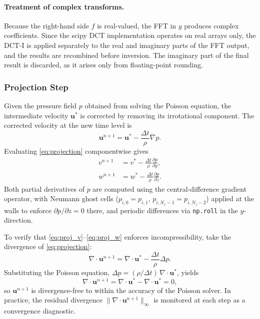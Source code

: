 \paragraph{Treatment of complex transforms.}
Because the right-hand side $f$ is real-valued, the FFT in $y$ produces
complex coefficients. Since the scipy DCT implementation operates on
real arrays only, the DCT-I is applied separately to the real and
imaginary parts of the FFT output, and the results are recombined before
inversion. The imaginary part of the final result is discarded, as it
arises only from floating-point rounding.

\subsubsection{Projection Step}
Given the pressure field $p$ obtained from solving the Poisson equation, the intermediate velocity $\mathbf{u}^*$ is
corrected by removing its irrotational component. The corrected
velocity at the new time level is
\begin{equation}
    \mathbf{u}^{n+1} = \mathbf{u}^* - \frac{\Delta t}{\rho}\nabla p.
    \label{eq:projection}
\end{equation}
Evaluating \eqref{eq:projection} componentwise gives
\begin{align}
    v^{n+1} &= v^* - \frac{\Delta t}{\rho}\frac{\partial p}{\partial y},
    \label{eq:proj_v} \\
    w^{n+1} &= w^* - \frac{\Delta t}{\rho}\frac{\partial p}{\partial z}.
    \label{eq:proj_w}
\end{align}
Both partial derivatives of $p$ are computed using the
central-difference gradient operator, with Neumann ghost cells
($p_{i,0} = p_{i,1}$, $p_{i,N_z-1} = p_{i,N_z-2}$) applied at the
walls to enforce $\partial p / \partial z = 0$ there, and periodic
differences via \texttt{np.roll} in the $y$-direction.

To verify that \eqref{eq:proj_v}--\eqref{eq:proj_w} enforces
incompressibility, take the divergence of \eqref{eq:projection}:
\begin{equation}
    \nabla \cdot \mathbf{u}^{n+1}
    = \nabla \cdot \mathbf{u}^*
    - \frac{\Delta t}{\rho} \Delta p.
\end{equation}
Substituting the Poisson equation,
$\Delta p = (\rho / \Delta t)\,\nabla\cdot\mathbf{u}^*$, yields
\begin{equation}
    \nabla \cdot \mathbf{u}^{n+1}
    = \nabla \cdot \mathbf{u}^*
    - \nabla \cdot \mathbf{u}^* = 0,
\end{equation}
so $\mathbf{u}^{n+1}$ is divergence-free to within the accuracy of
the Poisson solver. In practice, the residual divergence
$\|\nabla\cdot\mathbf{u}^{n+1}\|_\infty$ is monitored at each step
as a convergence diagnostic.

